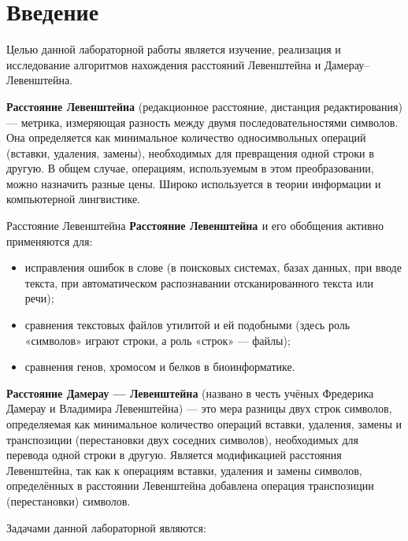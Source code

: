 \chapter*{Введение}

Целью данной лабораторной работы является изучение, реализация и исследование алгоритмов нахождения расстояний Левенштейна и Дамерау--Левенштейна.

\textbf{Расстояние Левенштейна}  (редакционное расстояние, дистанция редактирования) — метрика, измеряющая разность между двумя последовательностями символов. Она определяется как минимальное количество односимвольных операций (вставки, удаления, замены), необходимых для превращения одной строки в другую. В общем случае, операциям, используемым в этом преобразовании, можно назначить разные цены. Широко используется в теории информации и компьютерной лингвистике.


Расстояние Левенштейна \textbf{Расстояние Левенштейна \cite{Levenshtein}} и его обобщения активно применяются для:
\begin{itemize}
	\item исправления ошибок в слове (в поисковых системах, базах данных, при вводе текста, при автоматическом распознавании отсканированного текста или речи);
	\item сравнения текстовых файлов утилитой  и ей подобными (здесь роль «символов» играют строки, а роль «строк» — файлы);
	\item сравнения генов, хромосом и белков в биоинформатике.
\end{itemize}

\textbf{Расстояние Дамерау — Левенштейна} (названо в честь учёных Фредерика Дамерау и Владимира Левенштейна) — это мера разницы двух строк символов, определяемая как минимальное количество операций вставки, удаления, замены и транспозиции (перестановки двух соседних символов), необходимых для перевода одной строки в другую. Является модификацией расстояния Левенштейна, так как к операциям вставки, удаления и замены символов, определённых в расстоянии Левенштейна добавлена операция транспозиции (перестановки) символов.

\newpage

Задачами данной лабораторной являются:

